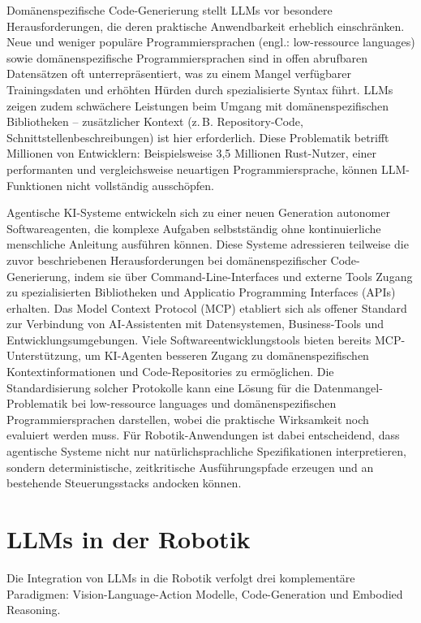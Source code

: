 Domänenspezifische Code-Generierung stellt LLMs vor besondere
Herausforderungen, die deren praktische Anwendbarkeit erheblich einschränken.
Neue und weniger populäre Programmiersprachen (engl.: low-ressource
languages) sowie
domänenspezifische Programmiersprachen sind in
offen abrufbaren Datensätzen oft unterrepräsentiert, was zu einem Mangel
verfügbarer Trainingsdaten und erhöhten
Hürden durch spezialisierte Syntax führt. LLMs zeigen
zudem schwächere Leistungen beim Umgang mit domänenspezifischen Bibliotheken
 – zusätzlicher Kontext (z.\,B. Repository-Code,
Schnittstellenbeschreibungen) ist hier erforderlich. Diese Problematik betrifft
Millionen von Entwicklern: Beispielsweise 3,5 Millionen Rust-Nutzer, einer
performanten und vergleichsweise neuartigen Programmiersprache,
können LLM-Funktionen nicht vollständig ausschöpfen.

Agentische KI-Systeme entwickeln sich zu einer neuen Generation
autonomer Softwareagenten, die komplexe Aufgaben selbstständig ohne
kontinuierliche
menschliche Anleitung ausführen können. Diese Systeme adressieren teilweise die
zuvor beschriebenen Herausforderungen bei domänenspezifischer Code-Generierung,
indem sie über Command-Line-Interfaces und externe Tools Zugang zu
spezialisierten Bibliotheken und Applicatio Programming Interfaces
(APIs) erhalten. Das Model Context Protocol (MCP)
etabliert sich als offener Standard zur Verbindung von AI-Assistenten mit
Datensystemen, Business-Tools und Entwicklungsumgebungen.
Viele Softwareentwicklungstools bieten bereits MCP-Unterstützung, um KI-Agenten
besseren Zugang zu domänenspezifischen Kontextinformationen und
Code-Repositories zu ermöglichen. Die Standardisierung solcher Protokolle kann
eine Lösung für die Datenmangel-Problematik bei low-ressource languages
und domänenspezifischen Programmiersprachen darstellen, wobei die praktische
Wirksamkeit noch evaluiert werden muss. Für Robotik-Anwendungen ist dabei
entscheidend, dass agentische Systeme nicht nur natürlichsprachliche
Spezifikationen interpretieren, sondern deterministische, zeitkritische
Ausführungspfade erzeugen und an bestehende Steuerungsstacks andocken können.

\section{LLMs in der Robotik}

Die Integration von LLMs in die Robotik verfolgt drei
komplementäre Paradigmen: Vision-Language-Action Modelle, Code-Generation und
Embodied Reasoning.

